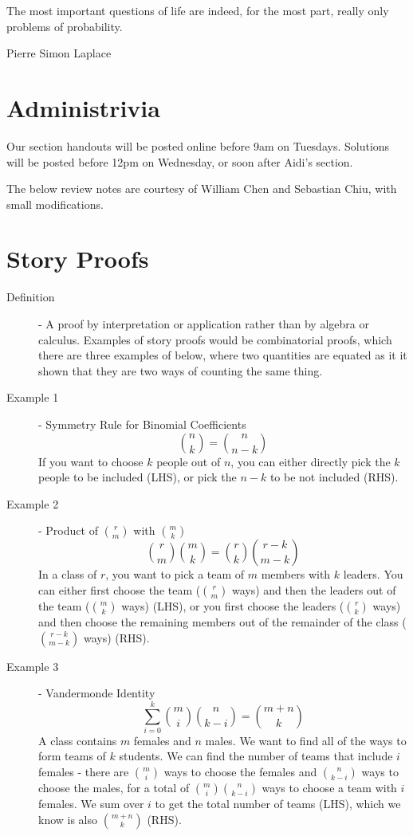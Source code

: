 \documentclass[11pt]{article}
\begin{document}

\setlength{\epigraphwidth}{.6\textwidth}
\epigraph{The most important questions of life are indeed, for the most part, really only problems of probability.}{Pierre Simon Laplace}

\section*{Administrivia}
Our section handouts will be posted online before 9am on Tuesdays. Solutions will be posted before 12pm on Wednesday, or soon after Aidi's section.

The below review notes are courtesy of William Chen and Sebastian Chiu, with small modifications.
\section*{Story Proofs}
\begin{description}
  \item[Definition] - A proof by interpretation or application rather than by algebra or calculus. Examples of story proofs would be combinatorial proofs, which there are three examples of below, where two quantities are equated as it it shown that they are two ways of counting the same thing.
  \item[Example 1] - Symmetry Rule for Binomial Coefficients
    \[{n \choose k} = {n \choose n-k}\]
    If you want to choose $k$ people out of $n$, you can either directly pick the $k$ people to be included (LHS), or pick the $n-k$ to be not included (RHS).
  \item[Example 2] - Product of ${r \choose m}$ with ${m \choose k}$
    \[{r \choose m}{m \choose k} = {r \choose k}{r-k \choose m-k}\]
    In a class of $r$, you want to pick a team of $m$ members with $k$ leaders. You can either first choose the team (${r \choose m}$ ways) and then the leaders out of the team (${m \choose k}$ ways) (LHS), or you first choose the leaders (${r \choose k}$ ways) and then choose the remaining members out of the remainder of the class (${r-k \choose m-k}$ ways) (RHS).
  \item[Example 3] - Vandermonde Identity
    \[\sum_{i=0}^k {m \choose i}{n \choose k-i} = {m + n \choose k}\]
    A class contains $m$ females and $n$ males. We want to find all of the ways to form teams of $k$ students. We can find the number of teams that include $i$ females - there are ${m \choose i}$ ways to choose the females and ${n \choose k-i}$ ways to choose the males, for a total of ${m \choose i}{n \choose k-i}$ ways to choose a team with $i$ females. We sum over $i$ to get the total number of teams (LHS), which we know is also ${m + n \choose k}$ (RHS).
\end{description}
\end{document}

